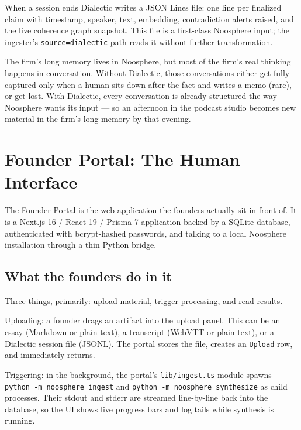 \documentclass[11pt]{article}
\begin{document}
When a session ends Dialectic writes a JSON Lines file: one line per finalized claim with timestamp, speaker, text, embedding, contradiction alerts raised, and the live coherence graph snapshot. This file is a first-class Noosphere input; the ingester's \texttt{source=dialectic} path reads it without further transformation.

\begin{intuitionbox}
The firm's long memory lives in Noosphere, but most of the firm's real thinking happens in conversation. Without Dialectic, those conversations either get fully captured only when a human sits down after the fact and writes a memo (rare), or get lost. With Dialectic, every conversation is already structured the way Noosphere wants its input --- so an afternoon in the podcast studio becomes new material in the firm's long memory by that evening.
\end{intuitionbox}

\clearpage

\section{Founder Portal: The Human Interface}

The Founder Portal is the web application the founders actually sit in front of. It is a Next.js 16 / React 19 / Prisma 7 application backed by a SQLite database, authenticated with bcrypt-hashed passwords, and talking to a local Noosphere installation through a thin Python bridge.

\subsection{What the founders do in it}

Three things, primarily: upload material, trigger processing, and read results.

Uploading: a founder drags an artifact into the upload panel. This can be an essay (Markdown or plain text), a transcript (WebVTT or plain text), or a Dialectic session file (JSONL). The portal stores the file, creates an \texttt{Upload} row, and immediately returns.

Triggering: in the background, the portal's \texttt{lib/ingest.ts} module spawns \texttt{python -m noosphere ingest} and \texttt{python -m noosphere synthesize} as child processes. Their stdout and stderr are streamed line-by-line back into the database, so the UI shows live progress bars and log tails while synthesis is running.
\end{document}
